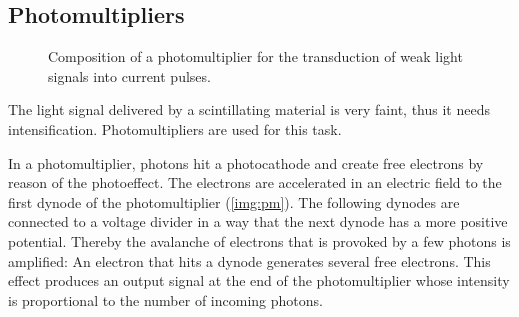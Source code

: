 \subsection{Photomultipliers}

\begin{figure}[H]
        \centering
        \def\svgwidth{0.6\textwidth}
       
        \caption{Composition of a photomultiplier for the transduction of weak light signals into current pulses.}
        \label{img:pm}
\end{figure}

The light signal delivered by a scintillating material is very faint, thus it needs intensification.
Photomultipliers are used for this task.

In a photomultiplier, photons hit a photocathode and create free electrons by reason of the photoeffect.
The electrons are accelerated in an electric field to the first dynode of the photomultiplier (\autoref{img:pm}).
The following dynodes are connected to a voltage divider in a way that the next dynode has a more positive potential.
Thereby the avalanche of electrons that is provoked by a few photons is amplified:
An electron that hits a dynode generates several free electrons.
This effect produces an output signal at the end of the photomultiplier whose intensity is proportional
to the number of incoming photons.
